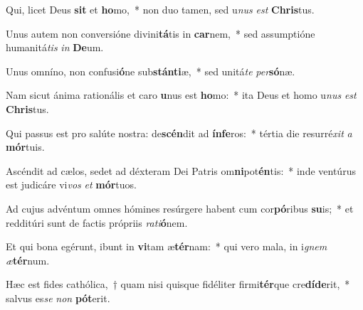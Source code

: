 \item Qui, licet Deus \textbf{sit} et \textbf{ho}mo,~* non duo tamen, sed u\textit{nus} \textit{est} \textbf{Chris}tus.
\item Unus autem non conversióne divini\textbf{tá}tis in \textbf{car}nem,~* sed assumptióne humanitá\textit{tis} \textit{in} \textbf{De}um.
\item Unus omníno, non confusi\textbf{ó}ne sub\textbf{stán}\textbf{ti}æ,~* sed unitá\textit{te} \textit{per}\textbf{só}næ.
\item Nam sicut ánima rationális et caro \textbf{u}nus est \textbf{ho}mo:~* ita Deus et homo u\textit{nus} \textit{est} \textbf{Chris}tus.
\item Qui passus est pro salúte nostra: de\textbf{scén}dit ad \textbf{ín}\textbf{fe}ros:~* tértia die resurré\textit{xit} \textit{a} \textbf{mór}tuis.
\item Ascéndit ad cælos, sedet ad déxteram Dei Patris om\textbf{ni}pot\textbf{én}tis:~* inde ventúrus est judicáre vi\textit{vos} \textit{et} \textbf{mór}tuos.
\item Ad cujus advéntum omnes hómines resúrgere habent cum cor\textbf{pó}ribus \textbf{su}is;~* et redditúri sunt de factis própriis \textit{ra}\textit{ti}\textbf{ó}nem.
\item Et qui bona egérunt, ibunt in \textbf{vi}tam æ\textbf{tér}nam:~* qui vero mala, in i\textit{gnem} \textit{æ}\textbf{tér}num.
\item Hæc est fides cathólica,~† quam nisi quisque fidéliter firmi\textbf{tér}que cre\textbf{dí}\textbf{de}rit,~* salvus es\textit{se} \textit{non} \textbf{pót}erit.
